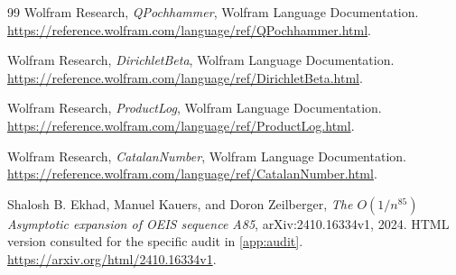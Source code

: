 \documentclass[11pt,a4paper]{article}
\theoremstyle{definition}
\theoremstyle{remark}
\numberwithin{equation}{section}
\begin{document}
{\begin{thebibliography}{99}
Wolfram Research, \emph{QPochhammer}, Wolfram Language Documentation. \url{https://reference.wolfram.com/language/ref/QPochhammer.html}.

Wolfram Research, \emph{DirichletBeta}, Wolfram Language Documentation. \url{https://reference.wolfram.com/language/ref/DirichletBeta.html}.

Wolfram Research, \emph{ProductLog}, Wolfram Language Documentation. \url{https://reference.wolfram.com/language/ref/ProductLog.html}.

Wolfram Research, \emph{CatalanNumber}, Wolfram Language Documentation. \url{https://reference.wolfram.com/language/ref/CatalanNumber.html}.

Shalosh B. Ekhad, Manuel Kauers, and Doron Zeilberger,
\emph{The $O(1/n^{85})$ Asymptotic expansion of OEIS sequence A85}, arXiv:2410.16334v1, 2024. HTML version consulted for the specific audit in \cref{app:audit}. \url{https://arxiv.org/html/2410.16334v1}.
\end{thebibliography}
}
\end{document}
